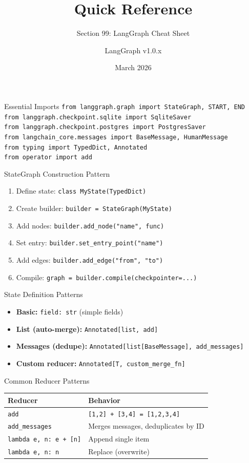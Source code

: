\documentclass[aspectratio=169,11pt]{beamer}
\title{Quick Reference}
\subtitle{Section 99: LangGraph Cheat Sheet}
\author{LangGraph v1.0.x}
\date{March 2026}
\begin{document}
\frame{\titlepage}

\begin{frame}{Essential Imports}
\small
\texttt{from langgraph.graph import StateGraph, START, END}\\
\texttt{from langgraph.checkpoint.sqlite import SqliteSaver}\\
\texttt{from langgraph.checkpoint.postgres import PostgresSaver}\\
\texttt{from langchain\_core.messages import BaseMessage, HumanMessage}\\
\texttt{from typing import TypedDict, Annotated}\\
\texttt{from operator import add}
\end{frame}

\begin{frame}{StateGraph Construction Pattern}
\setlength{\itemsep}{1pt}
\begin{enumerate}
\item Define state: \texttt{class MyState(TypedDict)}
\item Create builder: \texttt{builder = StateGraph(MyState)}
\item Add nodes: \texttt{builder.add\_node("name", func)}
\item Set entry: \texttt{builder.set\_entry\_point("name")}
\item Add edges: \texttt{builder.add\_edge("from", "to")}
\item Compile: \texttt{graph = builder.compile(checkpointer=...)}
\end{enumerate}
\end{frame}

\begin{frame}{State Definition Patterns}
\setlength{\itemsep}{1pt}
\begin{itemize}
\item \textbf{Basic:} \texttt{field: str} (simple fields)
\item \textbf{List (auto-merge):} \texttt{Annotated[list, add]}
\item \textbf{Messages (dedupe):} \texttt{Annotated[list[BaseMessage], add\_messages]}
\item \textbf{Custom reducer:} \texttt{Annotated[T, custom\_merge\_fn]}
\end{itemize}
\end{frame}

\begin{frame}{Common Reducer Patterns}
\small
\begin{tabular}{ll}
\toprule
\textbf{Reducer} & \textbf{Behavior} \\
\midrule
\texttt{add} & \texttt{[1,2] + [3,4] = [1,2,3,4]} \\
\texttt{add\_messages} & Merges messages, deduplicates by ID \\
\texttt{lambda e, n: e + [n]} & Append single item \\
\texttt{lambda e, n: n} & Replace (overwrite) \\
\bottomrule
\end{tabular}
\end{frame}
\end{document}
